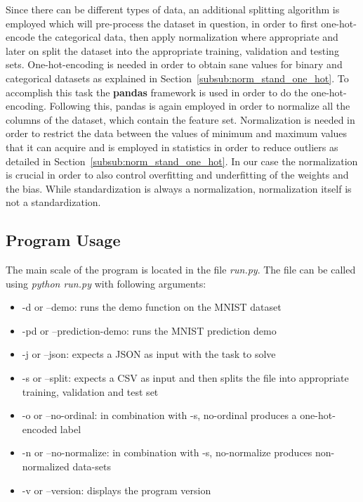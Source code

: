 \documentclass[12pt]{article}
\begin{document}
Since there can be different types of data, an additional splitting algorithm is employed which will pre-process the dataset in question, in order to first one-hot-encode the categorical data, then apply normalization where appropriate and later on split the dataset into the appropriate training, validation and testing sets. One-hot-encoding is needed in order to obtain sane values for binary and categorical datasets as explained in Section~\ref{subsub:norm_stand_one_hot}. To accomplish this task the \textbf{pandas} framework is used in order to do the one-hot-encoding. 
Following this, pandas is again employed in order to normalize all the columns of the dataset, which contain the feature set. Normalization is needed in order to restrict the data between the values of minimum and maximum values that it can acquire and is employed in statistics in order to reduce outliers as detailed in Section~\ref{subsub:norm_stand_one_hot}. In our case the normalization is crucial in order to also control overfitting and underfitting of the weights and the bias. While standardization is always a normalization, normalization itself is not a standardization. 
\subsection{Program Usage}
\label{sub:program}

The main scale of the program is located in the file \textit{run.py}. The file can be called using \textit{python run.py} with following arguments:
\begin{itemize}
    \item -d or --demo: runs the demo function on the MNIST dataset
    \item -pd or --prediction-demo: runs the MNIST prediction demo 
    \item -j or --json: expects a JSON as input with the task to solve
    \item -s or --split: expects a CSV as input and then splits the file into appropriate training, validation and test set
    \item -o or --no-ordinal: in combination with -s, no-ordinal produces a one-hot-encoded label
    \item -n or --no-normalize: in combination with -s, no-normalize produces non-normalized data-sets
    \item -v or --version: displays the program version
\end{itemize}

\end{document}

